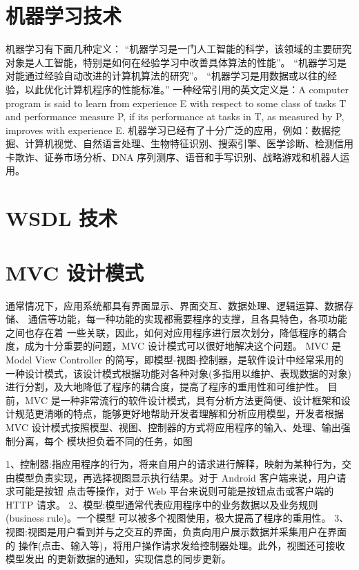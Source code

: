 \documentclass[doctor,secret]{thuthesis}
\begin{document}
\section{机器学习技术}
\label{sec:orgb4ba571}
机器学习有下面几种定义： “机器学习是一门人工智能的科学，该领域的主要研究对象是人工智能，特别是如何在经验学习中改善具体算法的性能”\cite{enbom_should_2013}。 “机器学习是对能通过经验自动改进的计算机算法的研究”。 “机器学习是用数据或以往的经验，以此优化计算机程序的性能标准。” 一种经常引用的英文定义是：A computer program is said to learn from experience E with respect to some class of tasks T and performance measure P, if its performance at tasks in T, as measured by P, improves with experience E. 
机器学习已经有了十分广泛的应用，例如：数据挖掘、计算机视觉、自然语言处理、生物特征识别、搜索引擎、医学诊断、检测信用卡欺诈、证券市场分析、DNA 序列测序、语音和手写识别、战略游戏和机器人运用。\cite{tierney-gumaer_review_2006} 
\section{WSDL 技术}
\label{sec:org0e30ceb}
\section{MVC 设计模式}
\label{sec:orgeaf2a3a}
通常情况下，应用系统都具有界面显示、界面交互、数据处理、逻辑运算、数据存储、 通信等功能，每一种功能的实现都需要程序的支撑，且各具特色，各项功能之间也存在着 一些关联，因此，如何对应用程序进行层次划分，降低程序的耦合度，成为十分重要的问题，MVC 设计模式可以很好地解决这个问题。
MVC 是 Model View Controller 的简写，即模型-视图-控制器，是软件设计中经常采用的一种设计模式，该设计模式根据功能对各种对象(多指用以维护、表现数据的对象) 进行分割，及大地降低了程序的耦合度，提高了程序的重用性和可维护性。
目前，MVC 是一种非常流行的软件设计模式，具有分析方法更简便、设计框架和设计规范更清晰的特点，能够更好地帮助开发者理解和分析应用模型，开发者根据 MVC 设计模式按照模型、视图、控制器的方式将应用程序的输入、处理、输出强制分离，每个 模块担负着不同的任务，如图

1、控制器:指应用程序的行为，将来自用户的请求进行解释，映射为某种行为，交由模型负责实现，再选择视图显示执行结果。对于 Android 客户端来说，用户请求可能是按钮 点击等操作，对于 Web 平台来说则可能是按钮点击或客户端的 HTTP 请求。
2、模型:模型通常代表应用程序中的业务数据以及业务规则(business rule)。一个模型 可以被多个视图使用，极大提高了程序的重用性。
3、视图:视图是用户看到并与之交互的界面，负责向用户展示数据并采集用户在界面的 操作(点击、输入等)，将用户操作请求发给控制器处理。此外，视图还可接收模型发出 的更新数据的通知，实现信息的同步更新。
\end{document}

